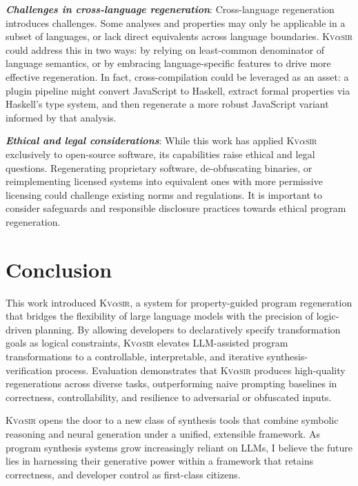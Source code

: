 \documentclass[nonacm,sigplan]{acmart}
\newcommand{\sys}{{\scshape Kv{$\alpha$}sir}\xspace}
\newcommand{\heading}[1]{\vspace{2pt}\noindent\textbf{\emph{#1}}:\enspace}
\begin{document}
\heading{Challenges in cross-language regeneration}
Cross-language regeneration introduces challenges.
Some analyses and
properties may only be applicable in a subset of languages, or lack direct
equivalents across language boundaries.
\sys could address this in two ways: by
relying on least-common denominator of language semantics, or by
embracing language-specific features to drive more effective regeneration.
In
fact, cross-compilation could be leveraged as an asset: a plugin pipeline might
convert JavaScript to Haskell, extract formal properties via Haskell’s type
system, and then regenerate a more robust JavaScript variant informed by that
analysis.

\heading{Ethical and legal considerations}
While this work has applied \sys exclusively to open-source software, its
capabilities raise ethical and legal questions.
Regenerating
proprietary software, de-obfuscating binaries, or reimplementing licensed
systems into equivalent ones with more permissive licensing 
could challenge existing norms and regulations. 
It is important to consider
safeguards and responsible disclosure practices towards ethical program regeneration.




\section{Conclusion}
This work introduced \sys, a system for property-guided program regeneration
that bridges the flexibility of large language models with the precision of
logic-driven planning.
By allowing developers to declaratively specify
transformation goals as logical constraints, \sys elevates LLM-assisted program
transformations to a controllable, interpretable, and iterative synthesis-verification
process.
Evaluation demonstrates that \sys produces high-quality regenerations
across diverse tasks, outperforming naive prompting baselines in correctness,
controllability, and resilience to adversarial or obfuscated inputs.

\sys opens the door to a new class of synthesis tools that combine symbolic
reasoning and neural generation under a unified, extensible framework.
As program synthesis systems grow increasingly reliant on LLMs, I believe the
future lies in harnessing their generative power within a framework that retains
correctness, and developer control as first-class citizens.
\end{document}
